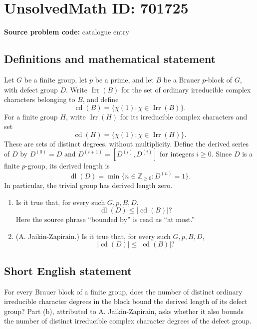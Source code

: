 \documentclass[11pt]{article}
\newcommand{\Z}{\mathbb{Z}}
\begin{document}
\section*{UnsolvedMath ID: 701725}
\textbf{Source problem code:} catalogue entry
\subsection{Definitions and mathematical statement}
Let \(G\) be a finite group, let \(p\) be a prime, and let \(B\) be a Brauer \(p\)-block of \(G\), with defect group \(D\). Write \(\operatorname{Irr}(B)\) for the set of ordinary irreducible complex characters belonging to \(B\), and define
\[
\operatorname{cd}(B)=\{\chi(1):\chi\in\operatorname{Irr}(B)\}.
\]
For a finite group \(H\), write \(\operatorname{Irr}(H)\) for its irreducible complex characters and set
\[
\operatorname{cd}(H)=\{\chi(1):\chi\in\operatorname{Irr}(H)\}.
\]
These are sets of distinct degrees, without multiplicity. Define the derived series of \(D\) by \(D^{(0)}=D\) and \(D^{(i+1)}=[D^{(i)},D^{(i)}]\) for integers \(i\geq 0\). Since \(D\) is a finite \(p\)-group, its derived length is
\[
\operatorname{dl}(D)=\min\{n\in\Z_{\geq 0}:D^{(n)}=1\}.
\]
In particular, the trivial group has derived length zero.

\begin{enumerate}
\item[(a)] Is it true that, for every such \(G,p,B,D\),
\[
\operatorname{dl}(D)\leq |\operatorname{cd}(B)|?
\]
Here the source phrase ``bounded by'' is read as ``at most.''
\item[(b)] (A. Jaikin-Zapirain.) Is it true that, for every such \(G,p,B,D\),
\[
|\operatorname{cd}(D)|\leq |\operatorname{cd}(B)|?
\]
\end{enumerate}
\subsection{Short English statement}
For every Brauer block of a finite group, does the number of distinct ordinary irreducible character degrees in the block bound the derived length of its defect group? Part (b), attributed to A. Jaikin-Zapirain, asks whether it also bounds the number of distinct irreducible complex character degrees of the defect group.
\end{document}
